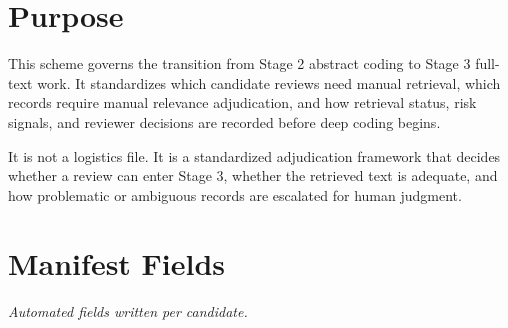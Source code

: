 \documentclass[11pt]{article}
\begin{document}
\section*{Purpose}
This scheme governs the transition from Stage 2 abstract coding to Stage 3 full-text work. It standardizes which candidate reviews need manual retrieval, which records require manual relevance adjudication, and how retrieval status, risk signals, and reviewer decisions are recorded before deep coding begins.

It is not a logistics file. It is a standardized adjudication framework that decides whether a review can enter Stage 3, whether the retrieved text is adequate, and how problematic or ambiguous records are escalated for human judgment.


\section*{Manifest Fields}
{\small\itshape Automated fields written per candidate.}\par\smallskip
\end{document}
